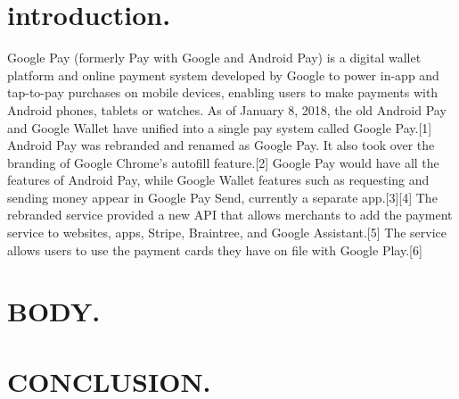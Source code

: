 \documentclass[10pt,a4paper]{article}
\begin{document}
\section{introduction.}
Google Pay (formerly Pay with Google and Android Pay) is a digital wallet platform and online payment system developed by Google to power in-app and tap-to-pay purchases on mobile devices, enabling users to make payments with Android phones, tablets or watches.
As of January 8, 2018, the old Android Pay and Google Wallet have unified into a single pay system called Google Pay.[1] Android Pay was rebranded and renamed as Google Pay. It also took over the branding of Google Chrome's autofill feature.[2] Google Pay would have all the features of Android Pay, while Google Wallet features such as requesting and sending money appear in Google Pay Send, currently a separate app.[3][4]
The rebranded service provided a new API that allows merchants to add the payment service to websites, apps, Stripe, Braintree, and Google Assistant.[5] The service allows users to use the payment cards they have on file with Google Play.[6]


\section{BODY.}

\section{CONCLUSION.}



\end{document}
